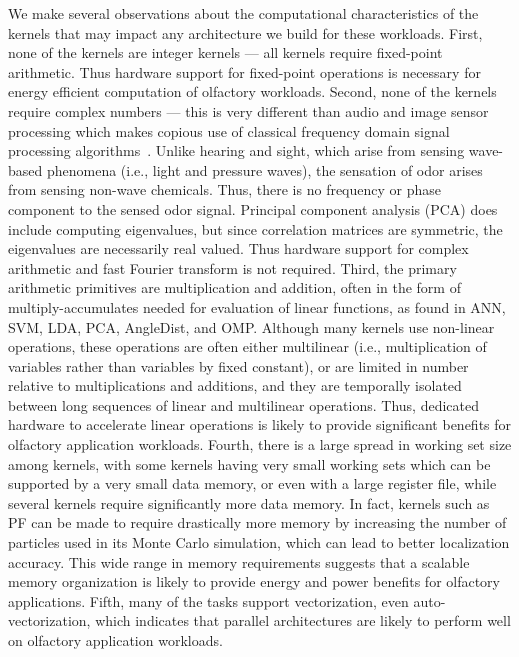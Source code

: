 We make several observations about the computational characteristics of the kernels that may impact any architecture we build for these workloads.
First, none of the
kernels are integer kernels --- all kernels require fixed-point arithmetic.
Thus hardware support for fixed-point operations is necessary for energy
efficient computation of olfactory workloads.
Second, none of the kernels require complex numbers --- this is very different
than audio and image sensor processing which makes copious use of classical
frequency domain signal processing algorithms~\cite{mandic2007complex, paris2011local}.
Unlike hearing and sight, which arise from sensing wave-based phenomena
(i.e., light and pressure waves),
the sensation of odor arises from sensing non-wave chemicals.  Thus, there
is no frequency or phase component to the sensed odor signal. Principal
component analysis (PCA) does include computing eigenvalues, but since
correlation matrices are symmetric, the eigenvalues are necessarily real
valued.  Thus hardware support for complex arithmetic and fast Fourier transform
is not required.
Third, the primary arithmetic primitives are multiplication and addition, often
in the form of multiply-accumulates needed for evaluation of linear functions,
as found in ANN, SVM, LDA, PCA, AngleDist, and OMP.  Although many kernels use
non-linear operations, these operations are often either multilinear (i.e.,
multiplication of variables rather than variables by fixed constant), or are
limited in number relative to multiplications and additions, and they are
temporally isolated between long sequences of linear and multilinear
operations.
Thus,
dedicated hardware to accelerate linear operations is likely to provide
significant benefits for olfactory application workloads.
Fourth, there is a large spread in working set size among kernels, with some
kernels having very small working sets which can be supported by a very small
data memory, or even with a large register file, while several kernels require
significantly more data memory.  In fact, kernels such as PF can be made
to require drastically more memory by increasing the number of particles used
in its Monte Carlo simulation, which can lead to better localization accuracy.
This wide range in memory requirements suggests that a scalable memory
organization is likely to provide energy and power benefits for olfactory
applications.
Fifth, many of the tasks support vectorization, even auto-vectorization, which
indicates that parallel architectures are likely to perform well on olfactory
application workloads.

